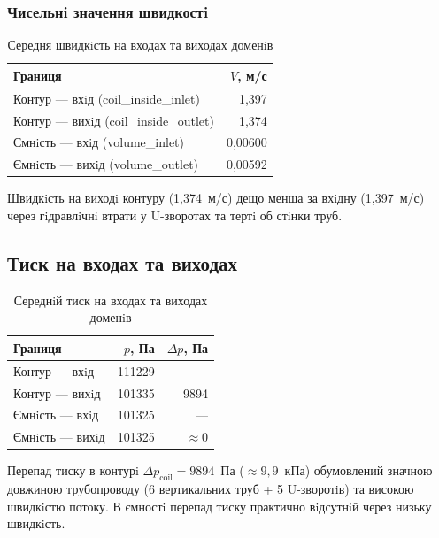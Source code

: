 \subsubsection{Чисельнi значення швидкостi}

\begin{table}[H]
  \centering
  \caption{Середня швидкiсть на входах та виходах доменiв}
  \begin{tabularx}{0.80\textwidth}{Xr}
    \toprule
    \textbf{Границя} & \textbf{$V$, м/с} \\
    \midrule
    Контур --- вхiд (coil\_inside\_inlet)   & 1{,}397 \\
    Контур --- вихiд (coil\_inside\_outlet) & 1{,}374 \\
    \midrule
    Ємнiсть --- вхiд (volume\_inlet)        & 0{,}00600 \\
    Ємнiсть --- вихiд (volume\_outlet)      & 0{,}00592 \\
    \bottomrule
  \end{tabularx}
\end{table}

Швидкiсть на виходi контуру (1{,}374~м/с) дещо менша за вхiдну (1{,}397~м/с) через гiдравлiчнi втрати у U-зворотах та тертi об стiнки труб.

\subsection{Тиск на входах та виходах}

\begin{table}[H]
  \centering
  \caption{Середнiй тиск на входах та виходах доменiв}
  \begin{tabularx}{0.80\textwidth}{Xrr}
    \toprule
    \textbf{Границя} & \textbf{$p$, Па} & \textbf{$\Delta p$, Па} \\
    \midrule
    Контур --- вхiд   & 111229 & --- \\
    Контур --- вихiд  & 101335 & 9894 \\
    \midrule
    Ємнiсть --- вхiд  & 101325 & --- \\
    Ємнiсть --- вихiд & 101325 & $\approx 0$ \\
    \bottomrule
  \end{tabularx}
\end{table}

Перепад тиску в контурi $\Delta p_{\mathrm{coil}} = 9894$~Па ($\approx 9{,}9$~кПа) обумовлений значною довжиною трубопроводу (6 вертикальних труб + 5 U-зворотiв) та високою швидкiстю потоку. В ємностi перепад тиску практично вiдсутнiй через низьку швидкiсть.

